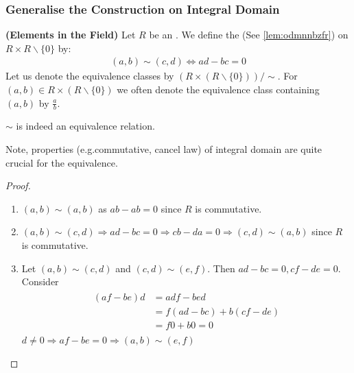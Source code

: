\documentclass{article}
\newcommand{\bfs}[1]{\textbf{({#1}) }}
\begin{document}
\subsubsection{Generalise the Construction on Integral Domain}
\begin{defa}\bfs{Elements in the Field}
 Let $R$ be an . We define the  (See \cref{lem:odmnnbzfr}) on $R \times R \backslash\{0\}$ by:
\begin{align*}
(a, b) \sim(c, d) \Longleftrightarrow a d-b c=0
\end{align*}
Let us denote the equivalence classes by $(R \times(R \backslash\{0\})) / \sim$.  For $(a, b) \in R \times(R \backslash\{0\})$ we often denote the equivalence class containing $(a, b)$ by $\frac{a}{b}$.
\end{defa}
\begin{lema}\label{lem:odmnnbzfr}$\sim$ is indeed an equivalence relation.
\end{lema} 
\begin{rema}
Note, properties (e.g.commutative, cancel law) of integral domain are quite crucial for the equivalence.
\end{rema}
\begin{proof}
\begin{enumerate}
    \item $(a, b) \sim(a, b)$ as $a b-a b=0$ since $R$ is commutative.
    \item  $(a, b) \sim(c, d) \Rightarrow a d-b c=0 \Rightarrow  cb-da=0 \Rightarrow(c, d) \sim(a, b)$ since $R$ is commutative.
    \item Let $(a, b) \sim(c, d)$ and $(c, d) \sim(e, f)$. Then $a d-b c=0, c f-d e=0$. Consider
\begin{align*}
\begin{aligned}
(a f-b e) d &=a d f-b e d \\
&=f(a d-b c)+b(c f-d e) \\
&=f 0+b 0=0
\end{aligned}
\end{align*}
$d \neq 0 \Rightarrow a f-b e=0 \Rightarrow(a, b) \sim(e, f)$
\end{enumerate}
\end{proof}
\end{document}
